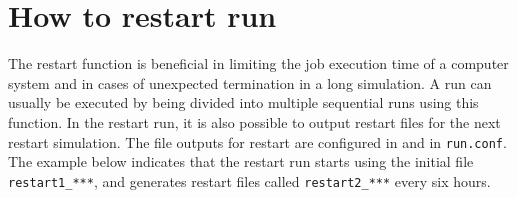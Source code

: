 \section{How to restart run}\label{sec:restart}
The restart function is beneficial in limiting the job execution time of a computer system and in cases of unexpected termination in a long simulation. A run can usually be executed by being divided into multiple sequential runs using this function. In the restart run, it is also possible to output restart files for the next restart simulation. The file outputs for restart are configured in  and  in \verb|run.conf|. The example below indicates that the restart run starts using the initial file \verb|restart1_***|, and generates restart files called \verb|restart2_***| every six hours.
